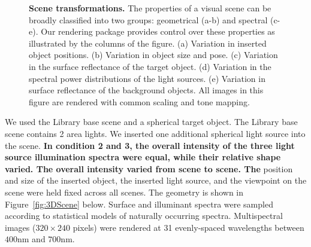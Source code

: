 \documentclass{jov}
\providecommand{\DIFaddtex}[1]{{\bf #1}} %
\providecommand{\DIFdeltex}[1]{} %
\providecommand{\DIFaddbegin}{} %
\providecommand{\DIFaddend}{} %
\providecommand{\DIFdelbegin}{} %
\providecommand{\DIFdelend}{} %
\providecommand{\DIFadd}[1]{\texorpdfstring{\DIFaddtex{#1}}{#1}} %
\providecommand{\DIFdel}[1]{\texorpdfstring{\DIFdeltex{#1}}{}} %
\newcommand{\DIFscaledelfig}{0.5}
\newlength{\DIFdelgraphicswidth} %
\newlength{\DIFdelgraphicsheight} %
\newcommand{\DIFaddincludegraphics}[2][]{{\color{blue}\fbox{\DIFOincludegraphics[#1]{#2}}}} %
\newcommand{\DIFdelincludegraphics}[2][]{%
\sbox{\DIFdelgraphicsbox}{\DIFOincludegraphics[#1]{#2}}%
\settoboxwidth{\DIFdelgraphicswidth}{\DIFdelgraphicsbox} %
\settoboxtotalheight{\DIFdelgraphicsheight}{\DIFdelgraphicsbox} %
\scalebox{\DIFscaledelfig}{%
\parbox[b]{\DIFdelgraphicswidth}{\usebox{\DIFdelgraphicsbox}\\[-\baselineskip] \rule{\DIFdelgraphicswidth}{0em}}\llap{\resizebox{\DIFdelgraphicswidth}{\DIFdelgraphicsheight}{%
\setlength{\unitlength}{\DIFdelgraphicswidth}%
\begin{picture}(1,1)%
\thicklines\linethickness{2pt} %
{\color[rgb]{1,0,0}\put(0,0){\framebox(1,1){}}}%
{\color[rgb]{1,0,0}\put(0,0){\line( 1,1){1}}}%
{\color[rgb]{1,0,0}\put(0,1){\line(1,-1){1}}}%
\end{picture}%
}\hspace*{3pt}}} %
} %
\DeclareRobustCommand{\DIFaddbegin}{\DIFOaddbegin \let\includegraphics\DIFaddincludegraphics} %
\DeclareRobustCommand{\DIFaddend}{\DIFOaddend \let\includegraphics\DIFOincludegraphics} %
\DeclareRobustCommand{\DIFdelbegin}{\DIFOdelbegin \let\includegraphics\DIFdelincludegraphics} %
\DeclareRobustCommand{\DIFdelend}{\DIFOaddend \let\includegraphics\DIFOincludegraphics} %
\begin{document}
\begin{figure}
    \caption{{\bf Scene transformations.} The properties of a visual scene can be broadly classified into two groups: geometrical (a-b) and spectral (c-e). Our rendering package provides control over these properties as illustrated by the columns of the figure. (a) Variation in inserted object positions. (b) Variation in object size and pose. (c) Variation in the surface reflectance of the target object. (d) Variation in the spectral power distributions of the light sources. (e) Variation in surface reflectance of the background objects. All images in this figure are rendered with common scaling and tone mapping.
\label{fig:VWCCTransformations}}
\end{figure}

We used the Library base scene and a spherical target object.
The Library base scene contains 2 area lights. 
We inserted one additional spherical light source into the scene.
\DIFdelbegin \DIFdel{The }\DIFdelend \DIFaddbegin \DIFadd{In condition 2 and 3, the overall intensity of the three light source illumination spectra were equal, while their relative shape varied.
The overall intensity varied from scene to scene.
The }\DIFaddend position and size of the inserted object, the inserted light source, and the viewpoint on the scene were held fixed across all 
scenes. The geometry is shown in Figure~\ref{fig:3DScene} below.
Surface and illuminant spectra were sampled according to statistical models of naturally occurring spectra.
Multispectral images ($320 \times 240$ pixels) were rendered at 31 evenly-spaced wavelengths between $400$nm and $700$nm.
\end{document}
